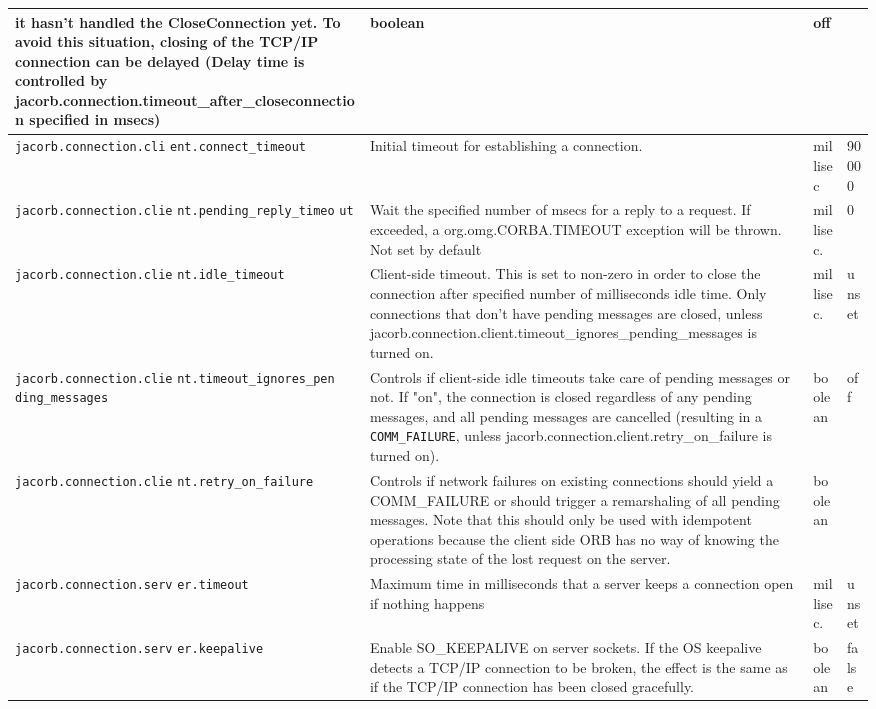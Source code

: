 {{\begin{small}
\begin{longtable}{|p{5cm}|p{7.5cm}|p{1.5cm}|p{1.5cm}|}
it hasn't handled the CloseConnection yet. To avoid this situation, closing
of the TCP/IP connection can be delayed (Delay time is controlled by
jacorb.connection.timeout\_after\_closeconnection specified in msecs) &
boolean & off \\
\hline
\verb"jacorb.connection.cli"
\verb"ent.connect_timeout" & Initial timeout for establishing a connection.
 & millisec & 90000 \\
\hline
\verb"jacorb.connection.clie"
\verb"nt.pending_reply_timeo"
\verb"ut" &  Wait the specified number of msecs for a reply to a
request. If exceeded, a org.omg.CORBA.TIMEOUT exception will be
thrown. Not set by default & millisec. & 0  \\
\hline
\verb"jacorb.connection.clie"
\verb"nt.idle_timeout" & Client-side timeout. This is set to non-zero in order
to close the connection after specified number of milliseconds idle time. Only
connections that don't have pending messages are closed, unless
jacorb.connection.client.timeout\_ignores\_pending\_messages is turned on. &
millisec. & unset \\
\hline
\verb"jacorb.connection.clie"
\verb"nt.timeout_ignores_pen"
\verb"ding_messages" & Controls if client-side idle timeouts take care of
pending messages or not. If "on", the connection is closed regardless of any
pending messages, and all pending messages are cancelled (resulting in a {\tt
COMM\_FAILURE}, unless jacorb.connection.client.retry\_on\_failure is turned
on).& boolean & off \\
\hline
\verb"jacorb.connection.clie"
\verb"nt.retry_on_failure" & Controls if network failures on existing connections
should yield a COMM\_FAILURE or should trigger a remarshaling
of all pending messages. Note that this should only be used with idempotent
operations because the client side ORB has no way of knowing the processing
state of the lost request on the server. & boolean & \\
\hline
\verb"jacorb.connection.serv"
\verb"er.timeout" & Maximum time in milliseconds that a server keeps a
connection open if nothing happens & millisec. & unset \\
\hline
\verb"jacorb.connection.serv"
\verb"er.keepalive" & Enable SO\_KEEPALIVE on server sockets. If the OS
keepalive detects a TCP/IP connection to be broken, the effect is the same as
if the TCP/IP connection has been closed gracefully. & boolean & false \\


\end{longtable}
\end{small}}}
